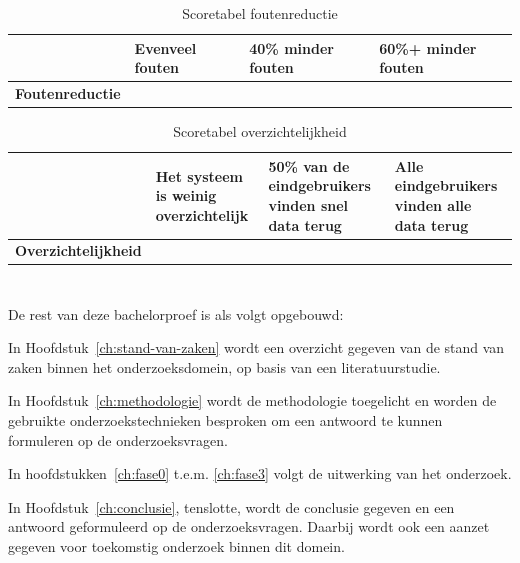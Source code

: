 \begin{table}[h]
    \centering   
    \begin{tabular}{|p{4cm}|p{3cm}|p{3cm}|p{3cm}|}
        \hline
        & \textbf{Evenveel fouten} & \textbf{40\% minder fouten} & \textbf{60\%+ minder fouten} \\
        \hline
        \textbf{Foutenreductie} &  &  &  \\
        \hline
    \end{tabular}
    \caption[Scoretabel fouten]{\label{tab:tbf}Scoretabel foutenreductie}
\end{table}

\begin{table}[h]
    \centering   
    \begin{tabular}{|p{4cm}|p{3cm}|p{3cm}|p{3cm}|}
        \hline
        & \textbf{Het systeem is weinig overzichtelijk} & \textbf{50\% van de eindgebruikers vinden snel data terug} & \textbf{Alle eindgebruikers vinden alle data terug} \\
        \hline
        \textbf{Overzichtelijkheid} &  &  &  \\
        \hline
    \end{tabular}
    \caption[Scoretabel overzicht]{\label{tab:tbo}Scoretabel overzichtelijkheid}
\end{table}

\pagebreak

\section{}%
\label{sec:opzet-bachelorproef}


De rest van deze bachelorproef is als volgt opgebouwd:

In Hoofdstuk~\ref{ch:stand-van-zaken} wordt een overzicht gegeven van de stand van zaken binnen het onderzoeksdomein, op basis van een literatuurstudie.

In Hoofdstuk~\ref{ch:methodologie} wordt de methodologie toegelicht en worden de gebruikte onderzoekstechnieken besproken om een antwoord te kunnen formuleren op de onderzoeksvragen.

In hoofdstukken~\ref{ch:fase0} t.e.m. \ref{ch:fase3} volgt de uitwerking van het onderzoek.

In Hoofdstuk~\ref{ch:conclusie}, tenslotte, wordt de conclusie gegeven en een antwoord geformuleerd op de onderzoeksvragen. Daarbij wordt ook een aanzet gegeven voor toekomstig onderzoek binnen dit domein.

